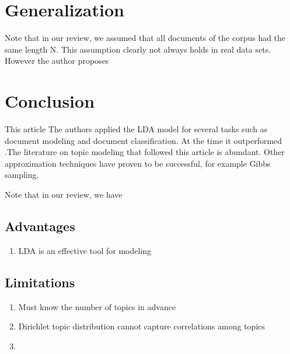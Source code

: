 \documentclass[12pt,a4paper,onecolumn]{article}
\begin{document}
\section{Generalization}

Note that in our review, we assumed that all documents of the corpus had the same length N. This assumption clearly not always holds in real data sets. However the author proposes

\section{Conclusion}
This article
The authors applied the LDA model for several tasks such as document modeling and document classification. At the time it outperformed .The literature on topic modeling that followed this article is abundant. Other approximation techniques have proven to be successful, for example Gibbs sampling.

Note that in our review, we have




\subsection{Advantages}

\begin{enumerate}
	\item LDA is an effective tool for modeling
\end{enumerate}

\subsection{Limitations}

\begin{enumerate}
	\item Must know the number of topics in advance
	\item Dirichlet topic distribution cannot capture correlations among topics
	\item
\end{enumerate}




\printbibliography
\end{document}
